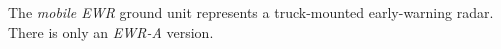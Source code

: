 
The \emph{mobile EWR} ground unit represents a truck-mounted early-warning radar. There is only an \emph{EWR-A} version.

